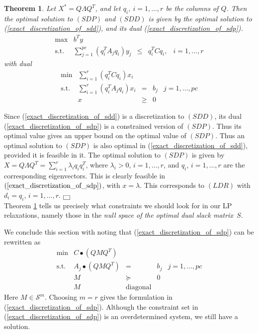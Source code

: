 \documentclass[12pt]{kluwer}
\newtheorem{theorem}{Theorem}
\newenvironment{proof}{{\raggedright\bf
 Proof:}\quad}{\hspace*{\fill}$\fbox{ }$\\}
\begin{document}
\begin{article}
\begin{theorem}
\label{exact_lp_relaxation}
Let $X^* = Q \Lambda Q^T$, and let $q_i$, $i=1,\ldots,r$ be the columns of $Q$. Then
the optimal solution to $(SDP)$ and $(SDD)$ is given by the optimal
solution to (\ref{exact_discretization_of_sdd}), and its dual
(\ref{exact_discretization_of_sdp}).
\begin{equation}
\label{exact_discretization_of_sdd}
\begin{array}{lrccc}
\max & b^Ty \\
\mbox{s.t.} & \sum_{j=1}^{pc}(q_i^TA_jq_i)y_j & \le & q_i^TCq_i, & i=1,\ldots,r
\end{array}
\end{equation}
with dual
\begin{equation}
\label{exact_discretization_of_sdp}
\begin{array}{lrccc}
\min & \sum_{i=1}^r(q_i^TCq_i)x_i \\
\mbox{s.t.} & \sum_{i=1}^r(q_i^TA_jq_i)x_i & = & b_j & j=1,\ldots,pc \\
& x & \ge & 0
\end{array}
\end{equation}
\end{theorem}
\begin{proof}
Since (\ref{exact_discretization_of_sdd}) is a discretization to $(SDD)$, its dual
(\ref{exact_discretization_of_sdp}) is a constrained version of $(SDP)$.
Thus its optimal value gives an upper bound on the optimal value of $(SDP)$. Thus an optimal
solution to $(SDP)$ is also optimal in (\ref{exact_discretization_of_sdd}),
provided it is feasible in it. The optimal
solution to $(SDP)$ is given by $X =  Q \Lambda Q^T = \sum_{i=1}^r \lambda_iq_iq_i^T$, where
$\lambda_i > 0$, $i=1,\ldots,r$, and $q_i$, $i=1,\ldots,r$ are the corresponding eigenvectors.
This is clearly feasible in $(\ref{exact_discretization_of_sdp})$, with $x = \lambda$.
This corresponds to $(LDR)$ with $d_i = q_i$, $i=1,\ldots,r$.
\end{proof}
Theorem \ref{exact_lp_relaxation} tells us precisely what constraints we should look for in our
LP relaxations, namely those in the {\em null space of the optimal dual slack matrix~$S$}.

We conclude this section with noting that (\ref{exact_discretization_of_sdp}) can be rewritten as
\begin{equation}
\label{exact_discretization_of_sdp_1}
\begin{array}{lrccc}
\min & C \bullet (QMQ^T) \\
\mbox{s.t.} & A_j \bullet (QMQ^T) & = & b_j & j=1,\ldots,pc \\
& M & \succeq & 0 \\
& M & \mbox{diagonal}
\end{array}
\end{equation}
Here $M \in \mathcal{S}^m$. Choosing $m = r$ gives the formulation in (\ref{exact_discretization_of_sdp}).
Although the constraint set in (\ref{exact_discretization_of_sdp}) is an overdetermined system,
we still have a solution.


\end{article}
\end{document}
